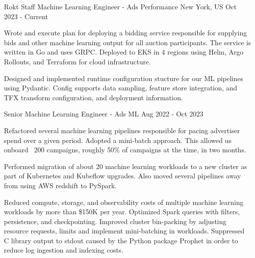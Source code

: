 

\begin{cventries}
\cventrywide
  {Rokt} %
  {Staff Machine Learning Engineer - Ads Performance} %
  {New York, US} %
  {Oct 2023 - Current} %
  {
    \begin{cvitems} %
      \item {Wrote and execute plan for deploying a bidding service responsible for supplying bids and other machine learning output for all auction participants. The service is written in Go and uses GRPC. Deployed to EKS in 4 regions using Helm, Argo Rollouts, and Terraform for cloud infrastructure. }
      \item {Designed and implemented runtime configuration stucture for our ML pipelines using Pydantic. Config supports data sampling, feature store integration, and TFX transform configuration, and deployment information. }
    \end{cvitems}
  }

\cventrywide
  {Senior Machine Learning Engineer - Ads ML} %
  {}
  {}
  {Aug 2022 - Oct 2023} %
  {
    \begin{cvitems} %
      \item {Refactored several machine learning pipelines responsible for pacing advertiser spend over a given period. Adopted a mini-batch approach. This allowed us onboard ~200 campaigns, roughly 50\% of campaigns at the time, in two months. }
      \item {Performed migration of about 20 machine learning workloads to a new cluster as part of Kubernetes and Kubeflow upgrades. Also moved several pipelines away from using AWS redshift to PySpark. }
      \item {Reduced compute, storage, and observability costs of multiple machine learning workloads by more than \$150K per year. Optimized Spark queries with filters, persistence, and checkpointing. Improved cluster bin-packing by adjusting resource requests, limits and implement mini-batching in workloads. Suppressed C library output to stdout caused by the Python package Prophet in order to reduce log ingestion and indexing costs. }
    \end{cvitems}
  }


\end{cventries}
